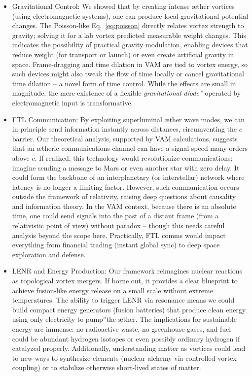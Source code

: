 \begin{itemize}

\item 
Gravitational Control: We showed that by creating intense æther vortices (using electromagnetic systems), one can produce local gravitational potential changes. The Poisson-like Eq. \eqref{eq:poisson} directly relates vortex strength to gravity; solving it for a lab vortex predicted measurable weight changes. This indicates the possibility of practical gravity modulation, enabling devices that reduce weight (for transport or launch) or even create artificial gravity in space. Frame-dragging and time dilation in VAM are tied to vortex energy, so such devices might also tweak the flow of time locally or cancel gravitational time dilation – a novel form of time control. While the effects are small in magnitude, the mere existence of a flexible \textit{\grqq gravitational diode\textquotedblright} operated by electromagnetic input is transformative.




\item 
FTL Communication: By exploiting superluminal æther wave modes, we can in principle send information instantly across distances, circumventing the $c$ barrier. Our theoretical analysis, supported by VAM calculations, suggests that an ætheric communications channel can have a signal speed many orders above $c$. If realized, this technology would revolutionize communications: imagine sending a message to Mars or even another star with zero delay. It could form the backbone of an interplanetary (or interstellar) network where latency is no longer a limiting factor. However, such communication occurs outside the framework of relativity, raising deep questions about causality and information theory. In the VAM context, because there is an absolute time, one could send signals into the past of a distant frame (from a relativistic point of view) without paradox – though this needs careful analysis beyond the scope here. Practically, FTL comms would impact everything from financial trading (instant global sync) to deep space exploration and defense.




\item 
LENR and Energy Production: Our framework reimagines nuclear reactions as topological vortex mergers. If borne out, it provides a clear blueprint to achieve fusion-like energy release on a small scale without extreme temperatures. The ability to trigger LENR via resonance means we could build compact energy generators (fusion batteries) that produce clean energy using only electricity to \grqq pump\textquotedblright the æther. The implications for sustainable energy are immense: no radioactive waste, no greenhouse gases, and fuel could be abundant hydrogen isotopes or even possibly ordinary hydrogen if catalyzed properly. Additionally, understanding matter as vortices could lead to new ways to synthesize elements (nuclear alchemy via controlled vortex coupling) or to stabilize otherwise short-lived states of matter.





\end{itemize}
